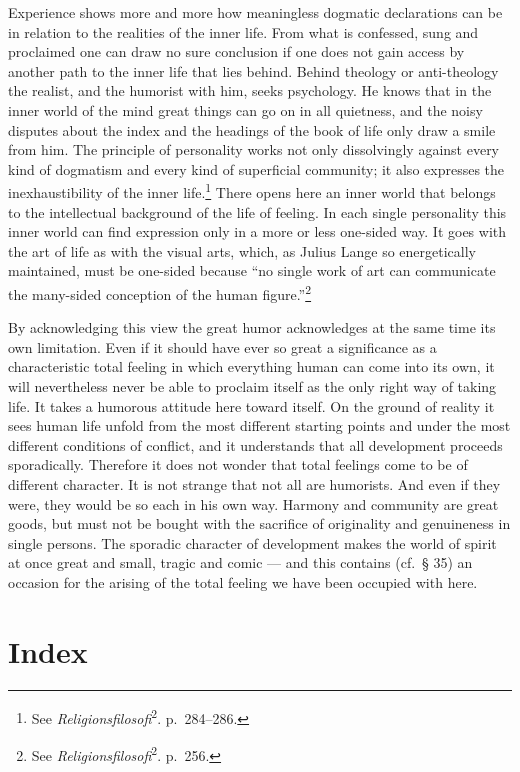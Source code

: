 \documentclass[12pt]{book}
\newcommand{\opage}[1]{\marginnote{\footnotesize\textit{[#1]}}}
\begin{document}
Experience shows more and more how meaningless dogmatic declarations can be in relation to the
realities of the inner life. From what is confessed, sung and proclaimed one can draw no sure
conclusion if one does not gain access by another path to the inner life that lies behind. Behind
theology or anti-theology the realist, and the humorist with him, seeks psychology. He knows that in
the inner world of the mind great things can go on in all quietness, and the noisy disputes about the
index and the headings of the book of life only draw a smile from him. The principle of personality
works not only dissolvingly against every kind of dogmatism and every kind of superficial community;
it also expresses the inexhaustibility of the inner life.\footnote{See
\textit{Religionsfilosofi}\textsuperscript{2}. p.~284--286.} There opens here an inner world that
belongs to the intellectual background of the life of feeling. In each single personality this inner
world can find expression only in a more or less one-sided way. It goes with the art of life as with
the visual arts, which, as Julius Lange so energetically maintained, must be one-sided because ``no
single work of art can communicate the many-sided conception of the human
figure.''\footnote{See \textit{Religionsfilosofi}\textsuperscript{2}. p.~256.}

By acknowledging this view the great humor acknowledges at the same time its own limitation. Even if
it should have ever so great a significance as a characteristic total feeling in which everything
human can come into its own, it will nevertheless never be able to proclaim itself as the only right
way of taking life. It takes a humorous attitude here toward itself. On the ground of reality it sees
human life unfold from the most different starting points and under the most different conditions of
conflict, and it understands that all development proceeds sporadically. Therefore it does not wonder
that total feelings come to be of different character. It is not strange that not all are humorists.
And even if they were, they would be so each in \opage{175}his own way. Harmony and community are
great goods, but must not be bought with the sacrifice of originality and genuineness in single
persons. The sporadic character of development makes the world of spirit at once great and small,
tragic and comic --- and this contains (cf.\ § 35) an occasion for the arising of the total feeling we
have been occupied with here.

\chapter*{Index}
\medskip
\end{document}
